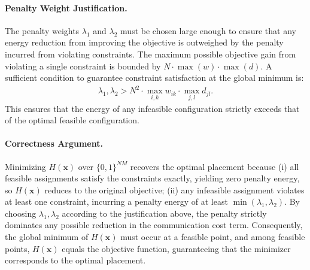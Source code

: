 \documentclass[12pt]{article}
\begin{document}
\paragraph{Penalty Weight Justification.}
The penalty weights $\lambda_1$ and $\lambda_2$ must be chosen large enough to ensure that any energy reduction from improving the objective is outweighed by the penalty incurred from violating constraints. The maximum possible objective gain from violating a single constraint is bounded by $N \cdot \max(w) \cdot \max(d)$. A sufficient condition to guarantee constraint satisfaction at the global minimum is:
\begin{align}
    \lambda_1, \lambda_2 > N^2 \cdot \max_{i,k} w_{ik} \cdot \max_{j,l} d_{jl}.
\end{align}
This ensures that the energy of any infeasible configuration strictly exceeds that of the optimal feasible configuration.

\paragraph{Correctness Argument.}
Minimizing $H(\mathbf{x})$ over $\{0,1\}^{NM}$ recovers the optimal placement because (i) all feasible assignments satisfy the constraints exactly, yielding zero penalty energy, so $H(\mathbf{x})$ reduces to the original objective; (ii) any infeasible assignment violates at least one constraint, incurring a penalty energy of at least $\min(\lambda_1, \lambda_2)$. By choosing $\lambda_1, \lambda_2$ according to the justification above, the penalty strictly dominates any possible reduction in the communication cost term. Consequently, the global minimum of $H(\mathbf{x})$ must occur at a feasible point, and among feasible points, $H(\mathbf{x})$ equals the objective function, guaranteeing that the minimizer corresponds to the optimal placement.
\end{document}
